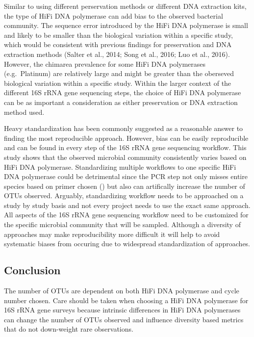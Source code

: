 \documentclass[12pt,]{article}
\begin{document}
Similar to using different perservation methods or different DNA
extraction kits, the type of HiFi DNA polymerase can add bias to the
observed bacterial community. The sequence error introduced by the HiFi
DNA polymerase is small and likely to be smaller than the biological
variation within a specific study, which would be consistent with
previous findings for preservation and DNA extraction methods (Salter et
al., 2014; Song et al., 2016; Luo et al., 2016). However, the chimarea
prevalence for some HiFi DNA polymerases (e.g.~Platinum) are relatively
large and might be greater than the oberseved biological variation
within a specific study. Within the larger context of the different 16S
rRNA gene sequencing steps, the choice of HiFi DNA polymerase can be as
important a consideration as either preservation or DNA extraction
method used.

Heavy standardization has been commonly suggested as a reasonable answer
to finding the most reproducible approach. However, bias can be easily
reproducible and can be found in every step of the 16S rRNA gene
sequencing workflow. This study shows that the observed microbial
community consistently varies based on HiFi DNA polymerase.
Standardizing multiple workflows to one specific HiFi DNA polymerase
could be detrimental since the PCR step not only misses entire species
based on primer chosen () but also can artifically increase the number
of OTUs observed. Arguably, standardizing workflow needs to be
approached on a study by study basis and not every project needs to use
the exact same approach. All aspects of the 16S rRNA gene sequencing
workflow need to be customized for the specific microbial community that
will be sampled. Although a diversity of approaches may make
reproducibility more difficult it will help to avoid systematic biases
from occuring due to widespread standardization of approaches.

\newpage

\subsection{Conclusion}\label{conclusion}

The number of OTUs are dependent on both HiFi DNA polymerase and cycle
number chosen. Care should be taken when choosing a HiFi DNA polymerase
for 16S rRNA gene surveys because intrinsic differences in HiFi DNA
polymerases can change the number of OTUs observed and influence
diversity based metrics that do not down-weight rare observations.
\end{document}
